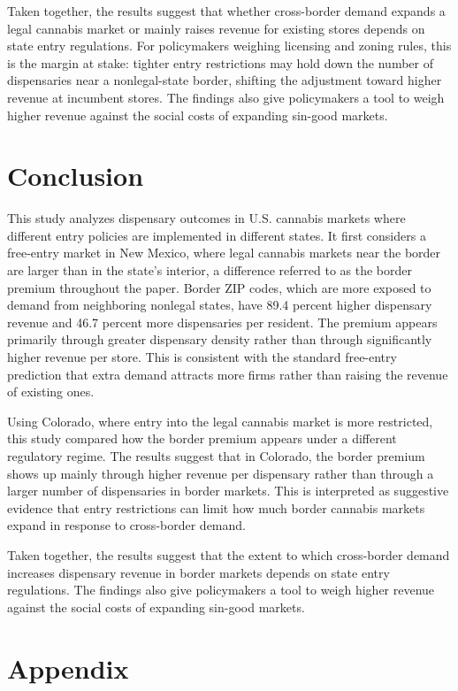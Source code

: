 \documentclass[english,12pt]{article}
\begin{document}
Taken together, the results suggest that whether cross-border demand expands a legal cannabis market or mainly raises revenue for existing stores depends on state entry regulations. For policymakers weighing licensing and zoning rules, this is the margin at stake: tighter entry restrictions may hold down the number of dispensaries near a nonlegal-state border, shifting the adjustment toward higher revenue at incumbent stores. The findings also give policymakers a tool to weigh higher revenue against the social costs of expanding sin-good markets.

\section{Conclusion}
\label{conclusion}

This study analyzes dispensary outcomes in U.S. cannabis markets where different entry policies are implemented
in different states. It first considers a free-entry market in New Mexico, where legal cannabis markets near the border are larger than in the state’s interior, a difference referred to as the border premium throughout the paper. Border ZIP codes, which are more exposed to demand from neighboring nonlegal states, have 89.4 percent higher dispensary revenue and 46.7 percent more dispensaries per resident.
The premium appears
primarily through greater dispensary density rather than through significantly higher revenue per store. This is consistent with the standard free-entry prediction that extra demand attracts more firms rather than raising the revenue of existing ones.

Using Colorado, where entry into the legal cannabis market is more restricted, this study compared how the border premium appears under a different regulatory regime. The results suggest that in Colorado, the border premium shows up mainly through higher revenue per dispensary rather than through a larger number of dispensaries in border markets. This is interpreted as suggestive evidence that entry restrictions can limit how much border cannabis markets expand in response to cross-border demand.

Taken together, the results suggest that the extent to which cross-border demand increases dispensary revenue in border markets depends on state entry regulations.
The findings also give policymakers a tool to weigh higher revenue against the social costs of expanding sin-good markets.

\newpage

\appendix
\section{Appendix}
\renewcommand{\thetable}{A.\arabic{table}}
\renewcommand{\thefigure}{A.\arabic{figure}}
\renewcommand{\theequation}{A.\arabic{equation}}
\setcounter{table}{0}
\setcounter{figure}{0}
\setcounter{equation}{0}
\end{document}
